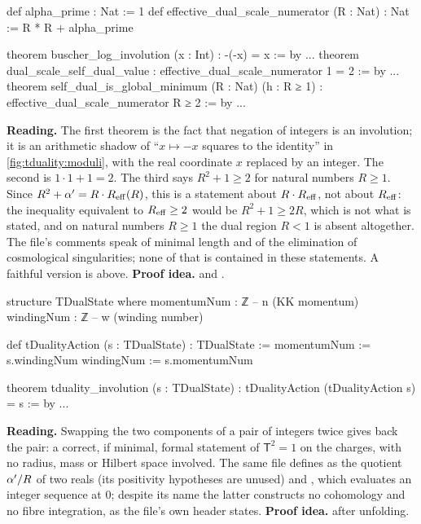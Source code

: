 \begin{leanbox}
\begin{leancode}
def alpha_prime : Nat := 1
def effective_dual_scale_numerator (R : Nat) : Nat := R * R + alpha_prime

theorem buscher_log_involution (x : Int) : -(-x) = x := by ...
theorem dual_scale_self_dual_value :
    effective_dual_scale_numerator 1 = 2 := by ...
theorem self_dual_is_global_minimum (R : Nat) (h : R ≥ 1) :
    effective_dual_scale_numerator R ≥ 2 := by ...
\end{leancode}
\textbf{Reading.} The first theorem is the fact that negation of integers is an involution;
it is an arithmetic shadow of ``$x\mapsto-x$ squares to the identity'' in
\cref{fig:tduality:moduli}, with the real coordinate $x$ replaced by an integer. The second
is $1\cdot1+1=2$. The third says $R^2+1\ge2$ for natural numbers $R\ge1$. Since
$R^2+\alpha'=R\cdot R_{\rm eff}(R)$, this is a statement about $R\cdot R_{\rm eff}$, not about
$R_{\rm eff}$: the inequality equivalent to $R_{\rm eff}\ge2$ would be $R^2+1\ge2R$, which is
not what is stated, and on natural numbers $R\ge1$ the dual region $R<1$ is absent altogether.
The file's comments speak of minimal length and of the elimination of cosmological
singularities; none of that is contained in these statements. A faithful version is
 above. \textbf{Proof idea.}  and
.
\end{leanbox}

\begin{leanbox}
\begin{leancode}
structure TDualState where
  momentumNum : ℤ   -- n (KK momentum)
  windingNum : ℤ    -- w (winding number)

def tDualityAction (s : TDualState) : TDualState :=
  { momentumNum := s.windingNum
    windingNum  := s.momentumNum }

theorem tduality_involution (s : TDualState) :
    tDualityAction (tDualityAction s) = s := by ...
\end{leancode}
\textbf{Reading.} Swapping the two components of a pair of integers twice gives back the
pair: a correct, if minimal, formal statement of $\mathsf T^2=1$ on the charges, with no
radius, mass or Hilbert space involved. The same file defines  as the quotient $\alpha'/R$ of two reals
(its positivity hypotheses are unused) and , which evaluates an integer
sequence at $0$; despite its name the latter constructs no cohomology and no fibre
integration, as the file's own header states. \textbf{Proof idea.}  after unfolding.
\end{leanbox}

